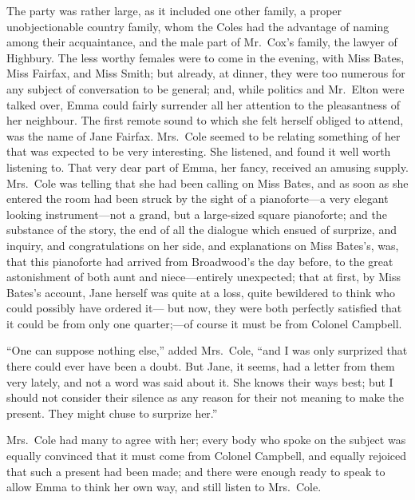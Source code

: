 The party was rather large, as it included one other family, a proper
unobjectionable country family, whom the Coles had the advantage of
naming among their acquaintance, and the male part of Mr.\ Cox's family,
the lawyer of Highbury.  The less worthy females were to come
in the evening, with Miss Bates, Miss Fairfax, and Miss Smith;
but already, at dinner, they were too numerous for any subject
of conversation to be general; and, while politics and Mr.\ Elton
were talked over, Emma could fairly surrender all her attention to
the pleasantness of her neighbour.  The first remote sound to which
she felt herself obliged to attend, was the name of Jane Fairfax.
Mrs.\ Cole seemed to be relating something of her that was expected to be
very interesting.  She listened, and found it well worth listening to.
That very dear part of Emma, her fancy, received an amusing supply.
Mrs.\ Cole was telling that she had been calling on Miss Bates,
and as soon as she entered the room had been struck by the sight
of a pianoforte---a very elegant looking instrument---not a grand,
but a large-sized square pianoforte; and the substance of the story,
the end of all the dialogue which ensued of surprize, and inquiry,
and congratulations on her side, and explanations on Miss Bates's, was,
that this pianoforte had arrived from Broadwood's the day before,
to the great astonishment of both aunt and niece---entirely unexpected;
that at first, by Miss Bates's account, Jane herself was quite at
a loss, quite bewildered to think who could possibly have ordered it---%
but now, they were both perfectly satisfied that it could be from only
one quarter;---of course it must be from Colonel Campbell.

``One can suppose nothing else,'' added Mrs.\ Cole, ``and I was only
surprized that there could ever have been a doubt.  But Jane,
it seems, had a letter from them very lately, and not a word was said
about it.  She knows their ways best; but I should not consider their
silence as any reason for their not meaning to make the present.
They might chuse to surprize her.''

Mrs.\ Cole had many to agree with her; every body who spoke on the
subject was equally convinced that it must come from Colonel Campbell,
and equally rejoiced that such a present had been made; and there
were enough ready to speak to allow Emma to think her own way,
and still listen to Mrs.\ Cole.


